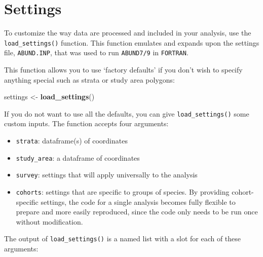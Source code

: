 \documentclass[
]{book}
\newenvironment{Shaded}{\begin{snugshade}}{\end{snugshade}}
\newcommand{\DecValTok}[1]{\textcolor[rgb]{0.00,0.00,0.81}{#1}}
\newcommand{\KeywordTok}[1]{\textcolor[rgb]{0.13,0.29,0.53}{\textbf{#1}}}
\newcommand{\NormalTok}[1]{#1}
\newcommand{\OperatorTok}[1]{\textcolor[rgb]{0.81,0.36,0.00}{\textbf{#1}}}
\newcommand{\StringTok}[1]{\textcolor[rgb]{0.31,0.60,0.02}{#1}}
\begin{document}
\hypertarget{settings}{%
\chapter{Settings}\label{settings}}

To customize the way data are processed and included in your analysis, use the \texttt{load\_settings()} function. This function emulates and expands upon the settings file, \texttt{ABUND.INP}, that was used to run \texttt{ABUND7/9} in \texttt{FORTRAN}.

This function allows you to use `factory defaults' if you don't wish to specify anything special such as strata or study area polygons:

\begin{Shaded}
\begin{Highlighting}[]
\NormalTok{settings <-}\StringTok{ }\KeywordTok{load_settings}\NormalTok{()}
\end{Highlighting}
\end{Shaded}

If you do not want to use all the defaults, you can give \texttt{load\_settings()} some custom inputs. The function accepts four arguments:

\begin{itemize}
\item
  \texttt{strata}: dataframe(s) of coordinates
\item
  \texttt{study\_area}: a dataframe of coordinates
\item
  \texttt{survey}: settings that will apply universally to the analysis
\item
  \texttt{cohorts}: settings that are specific to groups of species. By providing cohort-specific settings, the code for a single analysis becomes fully flexible to prepare and more easily reproduced, since the code only needs to be run once without modification.
\end{itemize}

The output of \texttt{load\_settings()} is a named list with a slot for each of these arguments:

\begin{Shaded}
\end{Shaded}
\end{document}
